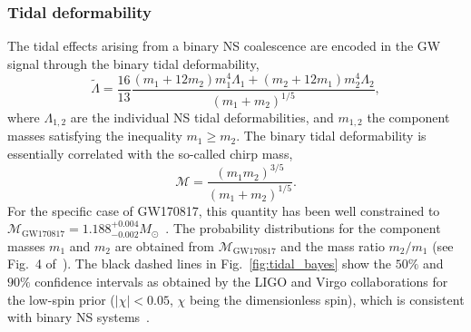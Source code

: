 \subsubsection{Tidal deformability} %

The tidal effects arising from a binary NS coalescence are encoded in the GW 
signal through the binary tidal deformability,
%
\begin{equation}
  \tilde{\Lambda} = \frac{16}{13}\frac{(m_1+12m_2)m_1^4\Lambda_1 +
  (m_2+12m_1)m_2^4\Lambda_2}{(m_1+m_2)^{1/5}},
\end{equation}
%
where $\Lambda_{1,2}$ are the individual NS tidal deformabilities,
and $m_{1,2}$ the component masses satisfying the inequality $m_1 \geq m_2$.
The binary tidal deformability is essentially correlated with the so-called
chirp mass,
%
\begin{equation}
  \mathcal{M} = \frac{(m_1 m_2)^{3/5}}{(m_1 + m_2)^{1/5}}.
\end{equation}
%
For the specific case of GW170817, this quantity has been well constrained 
to $\mathcal{M}_\text{GW170817} 
= 1.188_{-0.002}^{+0.004}M_\odot$~\cite{GWtidal}. The probability distributions 
for the component masses $m_1$ and $m_2$ are obtained from 
$\mathcal{M}_\text{GW170817}$ and the mass ratio $m_2/m_1$ (see Fig.~4
of~\cite{GWtidal}). The black dashed lines in Fig.~\ref{fig:tidal_bayes} show 
the $50\%$ and $90\%$ confidence intervals as obtained by the LIGO and Virgo 
collaborations for the low-spin prior ($|\chi| < 0.05$, $\chi$ being the
dimensionless spin), which is consistent with binary NS systems~\cite{GW2}.

